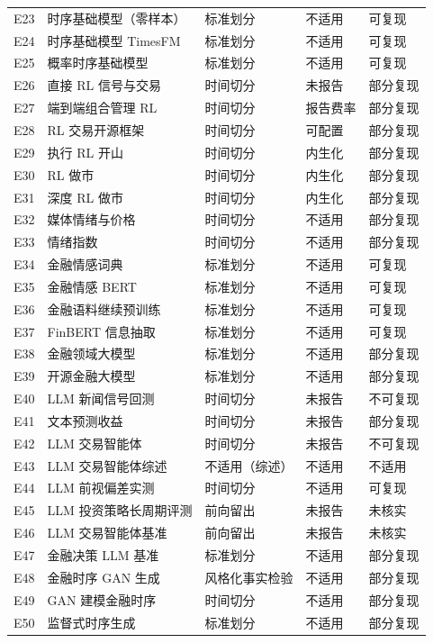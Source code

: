 {\begin{xltabular}{\textwidth}{@{}>{\raggedright\arraybackslash}p{0.7cm}>{\raggedright\arraybackslash}X>{\raggedright\arraybackslash}p{2.6cm}>{\raggedright\arraybackslash}p{2.4cm}>{\raggedright\arraybackslash}p{1.8cm}@{}}
E23 & 时序基础模型（零样本） & 标准划分 & 不适用 & 可复现 \\
E24 & 时序基础模型 TimesFM & 标准划分 & 不适用 & 可复现 \\
E25 & 概率时序基础模型 & 标准划分 & 不适用 & 可复现 \\
E26 & 直接 RL 信号与交易 & 时间切分 & 未报告 & 部分复现 \\
E27 & 端到端组合管理 RL & 时间切分 & 报告费率 & 部分复现 \\
E28 & RL 交易开源框架 & 时间切分 & 可配置 & 部分复现 \\
E29 & 执行 RL 开山 & 时间切分 & 内生化 & 部分复现 \\
E30 & RL 做市 & 时间切分 & 内生化 & 部分复现 \\
E31 & 深度 RL 做市 & 时间切分 & 内生化 & 部分复现 \\
E32 & 媒体情绪与价格 & 时间切分 & 不适用 & 部分复现 \\
E33 & 情绪指数 & 时间切分 & 不适用 & 部分复现 \\
E34 & 金融情感词典 & 标准划分 & 不适用 & 可复现 \\
E35 & 金融情感 BERT & 标准划分 & 不适用 & 可复现 \\
E36 & 金融语料继续预训练 & 标准划分 & 不适用 & 可复现 \\
E37 & FinBERT 信息抽取 & 标准划分 & 不适用 & 可复现 \\
E38 & 金融领域大模型 & 标准划分 & 不适用 & 部分复现 \\
E39 & 开源金融大模型 & 标准划分 & 不适用 & 部分复现 \\
E40 & LLM 新闻信号回测 & 时间切分 & 未报告 & 不可复现 \\
E41 & 文本预测收益 & 时间切分 & 未报告 & 部分复现 \\
E42 & LLM 交易智能体 & 时间切分 & 未报告 & 不可复现 \\
E43 & LLM 交易智能体综述 & 不适用（综述） & 不适用 & 不适用 \\
E44 & LLM 前视偏差实测 & 时间切分 & 不适用 & 可复现 \\
E45 & LLM 投资策略长周期评测 & 前向留出 & 未报告 & 未核实 \\
E46 & LLM 交易智能体基准 & 前向留出 & 未报告 & 未核实 \\
E47 & 金融决策 LLM 基准 & 标准划分 & 不适用 & 部分复现 \\
E48 & 金融时序 GAN 生成 & 风格化事实检验 & 不适用 & 部分复现 \\
E49 & GAN 建模金融时序 & 时间切分 & 不适用 & 部分复现 \\
E50 & 监督式时序生成 & 标准划分 & 不适用 & 部分复现 \\

\end{xltabular}}
